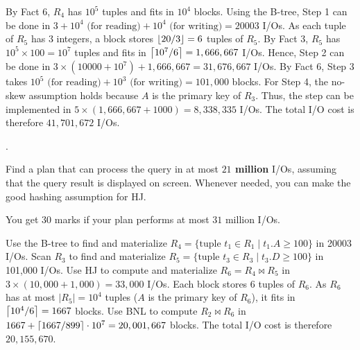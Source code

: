 \begin{sol}
     By Fact 6, $R_4$ has $10^5$ tuples and fits in $10^4$ blocks. Using the B-tree, Step 1 can be done in $3 + 10^4 \text{ (for reading)} + 10^4 \text{ (for writing)} = 20003$ I/Os. As each tuple of $R_5$ has 3 integers, a block stores $\left \lfloor 20/3 \right \rfloor = 6$ tuples of $R_5$. By Fact 3, $R_5$ has $10^5 \times 100 = 10^7$ tuples and fits in $\left \lceil 10^7 / 6 \right \rceil = 1,666,667$ I/Os. Hence, Step 2 can be done in $3 \times (10000 + 10^7) + 1,666,667 = 31,676,667$ I/Os. By Fact 6, Step 3 takes $10^5 \text{ (for reading)} + 10^3 \text{ (for writing)} = 101,000$ blocks. For Step 4, the no-skew assumption holds because $A$ is the primary key of $R_3$. Thus, the step can be implemented in $5 \times (1,666,667 + 1000) = 8,338,335$ I/Os. The total I/O cost is therefore $41,701,672$ I/Os.
\end{sol}


\pagebreak
.

\vspace{100mm}

 Find a plan that can process the query in at most {\bf $21$ million} I/Os, assuming that the query result is displayed on screen. Whenever needed, you can make the good hashing assumption for HJ.

\vgap

You get 30 marks if your plan performs at most $31$ million I/Os.

\begin{sol}
     Use the B-tree to find and materialize $R_4 = \{\text{tuple } t_1 \in R_1 \mid t_1.A \ge 100\}$ in 20003 I/Os. Scan $R_3$ to find and materialize $R_5 = \{\text{tuple } t_3 \in R_3 \mid t_3.D \ge 100\}$ in 101,000 I/Os. Use HJ to compute and materialize $R_6 = R_4 \bowtie R_5$ in $3 \times (10,000 + 1,000) = 33,000$ I/Os. Each block stores 6 tuples of $R_6$. As $R_6$ has at most $|R_5| = 10^4$ tuples ($A$ is the primary key of $R_6$), it fits in $\left \lceil 10^4 / 6 \right \rceil = 1667$ blocks. Use BNL to compute $R_2 \bowtie R_6$ in $1667 + \left \lceil 1667 / 899 \right \rceil \cdot 10^7 = 20,001,667$ blocks. The total I/O cost is therefore $20,155,670$.
\end{sol}


